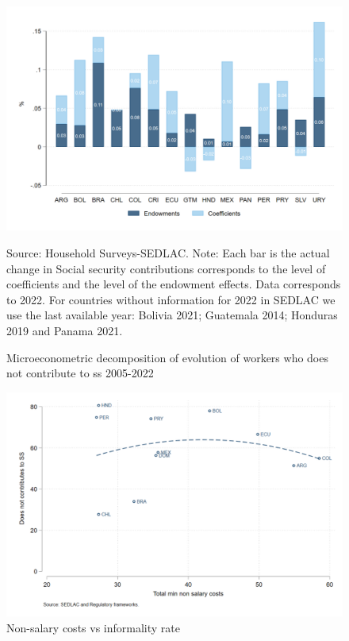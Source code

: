 \documentclass[english]{article}
\begin{document}
\begin{figure}[H]
        \justifying
        \caption{Microeconometric decomposition of evolution of workers who does not contribute to ss 2005-2022}     
       \centerline{\includegraphics[scale=.3]{latex/figures/Snapshot/Oaxaca decomposition level.png}
        \label{fig:Oaxaca_level}}
        \footnotesize{Source: Household Surveys-SEDLAC.}
        \footnotesize{Note: Each bar is the actual change in Social security contributions corresponds to the level of coefficients and the level of the endowment effects.  Data corresponds to 2022. For countries without information for 2022 in SEDLAC we use the last available year: Bolivia 2021; Guatemala 2014; Honduras 2019 and Panama 2021.}
 \end{figure}

 \begin{figure}[H]
        \justifying
        \caption{Non-salary costs vs informality rate}     
       \centerline{\includegraphics[scale=.3]{latex/figures/Snapshot/Non_salary_costs_total_min.png}}
        \label{fig:Nonsalarycosts}
       
 \end{figure}
\end{document}
